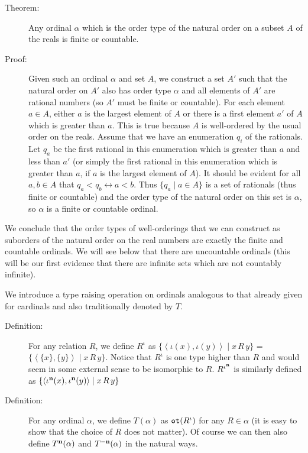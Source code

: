 \documentclass[12pt]{book}
\begin{document}
\begin{description}
\item[Theorem:] Any ordinal $\alpha$ which is the order type of the
natural order on a subset $A$ of the reals is finite or countable.

\item[Proof:] Given such an ordinal $\alpha$ and set $A$, we construct
a set $A'$ such that the natural order on $A'$ also has order type
$\alpha$ and all elements of $A'$ are rational numbers (so $A'$ must
be finite or countable).  For each element $a \in A$, either $a$ is
the largest element of $A$ or there is a first element $a'$ of $A$
which is greater than $a$.  This is true because $A$ is well-ordered
by the usual order on the reals.  Assume that we have an enumeration
$q_i$ of the rationals.  Let $q_a$ be the first rational in this
enumeration which is greater than $a$ and less than $a'$ (or simply
the first rational in this enumeration which is greater than $a$, if
$a$ is the largest element of $A$).  It should be evident for all $a,b
\in A$ that $q_a < q_b \leftrightarrow a<b$.  Thus $\{q_a \mid a \in A\}$ is a
set of rationals (thus finite or countable) and the order type of the
natural order on this set is $\alpha$, so $\alpha$ is a finite or
countable ordinal.

\end{description}

We conclude that the order types of well-orderings that we can
construct as suborders of the natural order on the real numbers are
exactly the finite and countable ordinals.  We will see below that
there are uncountable ordinals (this will be our first evidence that
there are infinite sets which are not countably infinite).


We introduce a type raising operation on ordinals analogous to that
already given for cardinals and also traditionally denoted by $T$.

\begin{description}

\item[Definition:] For any relation $R$, we define $R^{\iota}$ as
$\{\left<\iota(x),\iota(y)\right> \mid x\,R\,y\}$ = $\{\left<\{x\},\{y\}\right> \mid x\,R\,y\}$.  Notice that
$R^{\iota}$ is one type higher than $R$ and would seem in some
external sense to be isomorphic to $R$.  $R^{\iota^{\bf n}}$ is similarly
defined as $\{\left<\iota^{\bf n}(x),\iota^{\bf n}(y)\right> \mid x\,R\,y\}$

\item[Definition:] For any ordinal $\alpha$, we define $T(\alpha)$ as
${\tt ot}(R^{\iota})$ for any $R \in \alpha$ (it is easy to show that the
choice of $R$ does not matter).  Of course we can then also define
$T^{\bf n}(\alpha)$ and $T^{\bf -n}(\alpha)$ in the natural ways.

\end{description}
\end{document}
